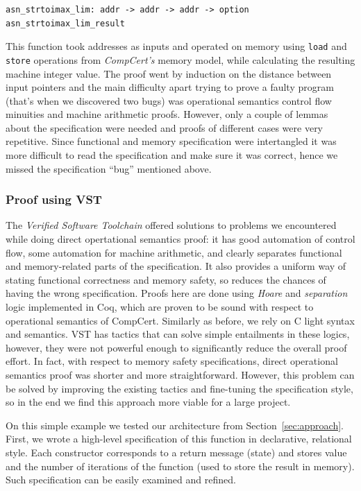 \documentclass[acmsmall,nonacm]{acmart}
\begin{document}
\begin{lstlisting}[language=Coq]
asn_strtoimax_lim: addr -> addr -> addr -> option asn_strtoimax_lim_result
\end{lstlisting}

This function took addresses as inputs and operated on memory using
\texttt{load} and \texttt{store} operations from \textit{CompCert's}
memory model, while calculating the resulting machine integer
value. The proof went by induction on the distance between input
pointers and the main difficulty apart trying to prove a faulty
program (that's when we discovered two bugs) was operational semantics
control flow minuities and machine arithmetic proofs. However, only a
couple of lemmas about the specification were needed and proofs of
different cases were very repetitive. Since functional and memory
specification were intertangled it was more difficult to read the
specification and make sure it was correct, hence we missed the
specification ``bug'' mentioned above.

\subsubsection{Proof using VST}

The \textit{Verified Software Toolchain} \cite{VST} offered solutions
to problems we encountered while doing direct opertational semantics
proof: it has good automation of control flow, some automation for
machine arithmetic, and clearly separates functional and
memory-related parts of the specification. It also provides a uniform
way of stating functional correctness and memory safety, so reduces
the chances of having the wrong specification. Proofs here are done
using \textit{Hoare} and \textit{separation} logic implemented in Coq,
which are proven to be sound with respect to operational semantics of
CompCert. Similarly as before, we rely on C light syntax and
semantics. VST has tactics that can solve simple entailments in these
logics, however, they were not powerful enough to significantly reduce
the overall proof effort. In fact, with respect to memory safety
specifications, direct operational semantics proof was shorter and
more straightforward. However, this problem can be solved by improving
the existing tactics and fine-tuning the specification style, so in
the end we find this approach more viable for a large project.

On this simple example we tested our architecture from
Section~\ref{sec:approach}. First, we wrote a high-level specification
of this function in declarative, relational style. Each constructor
corresponds to a return message (state) and stores value and the
number of iterations of the function (used to store the result in
memory). Such specification can be easily examined and refined.
\end{document}
